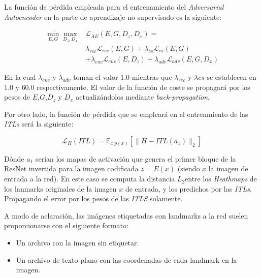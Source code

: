             \medskip

            \noindent La función de pérdida empleada para el entrenamiento del \textit{Adversarial Autoencoder} en la parte de aprendizaje no supervisado es la siguiente: 
            
            \begin{align*}
                \min_{E,G} \max_{D_z,D_x} & \mathcal{L}_{AE}(E,G,D_z,D_x) = \\
                & \lambda_{rec} \mathcal{L}_{rec}(E,G) + \lambda_{cs}\mathcal{L}_{cs}(E,G) \\
                & + \lambda_{enc}\mathcal{L}_{enc}(E,D_z)+ \lambda_{adv} \mathcal{L}_{adv}(E,G,D_x)
            \end{align*}

            \noindent En la cual $\lambda_{enc}$ y $\lambda_{adv}$ toman el valor $1.0$ mientras que $\lambda_{rec}$ y $\lambda{cs}$ se establecen en $1.0$ y $60.0$ respectivamente. El valor de la función de coste se propagará por los pesos de $E$,$G$,$D_z$ y $D_x$ actualizándolos mediante \textit{back-propagation}.

            \medskip

            \noindent Por otro lado, la función de pérdida que se empleará en el entrenmiento de las \textit{ITLs} será la siguiente: 

            \begin{equation} \label{eq::L2}
                \mathcal{L}_H(ITL) = \mathbb{E}_{x ~ p(x)} \left[ \| H-ITL(a_1)\|_2 \right]
            \end{equation}

            \noindent Dónde $a_1$ serían los mapas de activación que genera el primer bloque de la ResNet invertida para la imagen codificada $z=E(x)$ (siendo $x$ la imagen de entrada a la red). En este caso se computa la distancia \textbf{$L_2$}entre los \textit{Heathmaps} de los lanmarks originales de la imagen $x$ de entrada, y los predichos por las \textit{ITLs}. Propagando el error por los pesos de las \textit{ITLS} solamente.

            \medskip

            \noindent A modo de aclaración, las imágenes etiquetadas con landmarks a la red suelen proporcionarse con el siguiente formato: 

            \begin{itemize}
                \item Un archivo con la imagen sin etiquetar. 
                \item Un archivo de texto plano con las coordenadas de cada landmark en la imagen.
            \end{itemize}

